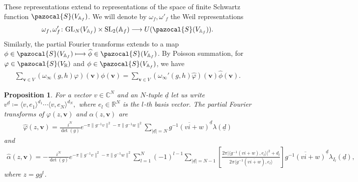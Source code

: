 \documentclass[twoside,a4paper,10pt]{article} %
\newcommand{\uud}{\underline{d}}
\newcommand{\alphahat}{\widehat{\alpha}}
\newcommand{\8}{\infty}
\newcommand{\vbf}{\mathbf{v}}
\newcommand{\SL}{\mathrm{SL}}
\newcommand{\GL}{\mathrm{GL}}
\newcommand{\R}{\mathbb{R}}
\newcommand{\A}{\mathbb{A}}
\newcommand{\C}{\mathbb{C}}
\newcommand{\vphat}{\widehat{\phi}}
\newcommand{\Scal}{\pazocal{S}}
\theoremstyle{mytheoremstyle}
\newtheorem{prop}[thm]{Proposition}
\theoremstyle{remark}
\numberwithin{equation}{section}
\begin{document}
These representations extend to representations of the space of finite Schwartz function $\Scal(V_{\A_f})$. We will denote by $\omega_f,\omega'_f$ the Weil representations
\begin{align}
\omega_f ,\omega'_f \colon \GL_N(V_{\A_f}) \times \SL_2(\A_f) \longrightarrow U(\Scal(V_{\A_f})).
\end{align} Similarly, the partial Fourier transforms extends to a map $\phi \in \Scal(V_{\A_f}) \longmapsto \vphat \in \Scal(V_{\A_f})$.  
%
By Poisson summation, for $\varphi \in \Scal(V_\R)$ and $\phi \in \Scal(V_{\A_f})$, we have
\begin{align}
\sum_{\vbf \in V} (\omega_\8(g,h)\varphi)(\vbf)\phi(\vbf)=\sum_{\vbf \in V} (\omega_\8'(g,h)\widehat{\varphi})(\vbf)\vphat(\vbf).
\end{align}
\begin{prop}\label{prop fourier transform}\cite[Proposition.~4.9]{rbrsln} For a vector $v \in \C^N$ and an $N$-tuple $\uud$ let us write $v^{\uud} \coloneqq \langle v,e_1\rangle^{d_1} \cdots\langle v,e_N\rangle^{d_N},$ where $e_l \in \R^N$ is the $l$-th basis vector.
The partial Fourier transforms of $\varphi(z,\vbf)$ and $\alpha(z,\vbf)$ are
 \begin{align} \label{partial fourier vphat}
\widehat{\varphi}(z,\vbf)=\frac{i^N}{\det(g)} e^{-\pi  \lVert g^{-1}v\rVert^2-\pi \lVert g^{-1} w \rVert^2} \sum_{\vert \uud \vert=N}  \overline{g^{-1}(vi+w)}^{\uud}  \lambda(\uud)
\end{align}
 and
 \begin{align}
\alphahat(z,\vbf) =-\frac{i^N}{\det(g)}e^{-\pi  \lVert g^{-1}v\rVert^2-\pi \lVert g^{-1} w \rVert^2} \sum_{l=1}^N (-1)^{l-1}\sum_{\vert \uud \vert=N-1} \left [ \frac{2\pi \vert \langle g^{-1}(vi+w),e_l\rangle \vert ^2+d_l}{2\pi\langle g^{-1}(\overline{vi+w}),e_l\rangle}\right ] \overline{g^{-1}(vi+w)}^{\uud}  \lambda_{I_l}(\uud),
\end{align}
where $z=gg^t$.
\end{prop}
\end{document}
